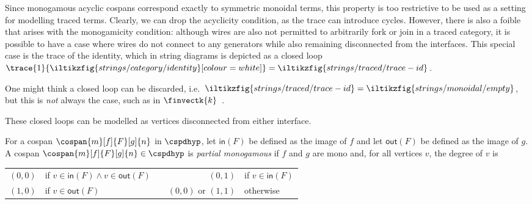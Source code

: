 Since monogamous acyclic cospans correspond exactly to symmetric monoidal terms,
this property is too restrictive to be used as a setting for modelling traced
terms.
Clearly, we can drop the acyclicity condition, as the trace can introduce
cycles.
However, there is also a foible that arises with the monogamicity condition:
although wires are also not permitted to arbitrarily fork or join in a traced
category, it is possible to have a case where wires do not connect to
any generators while also remaining disconnected from the interfaces.
This special case is the trace of the identity, which in string diagrams is
depicted as a closed
loop \(
\trace{1}{\iltikzfig{strings/category/identity}[colour=white]}
=
\iltikzfig{strings/traced/trace-id}
\).

\begin{remark}
    One might think a closed loop can be discarded, i.e.\ \(
    \iltikzfig{strings/traced/trace-id}
    =
    \iltikzfig{strings/monoidal/empty}
    \), but this is \emph{not} always the case, such as in
    \(\finvectk{k}\)~\cite[Sec.\ 6.1]{hasegawa1997recursion}.
\end{remark}

These closed loops can be modelled as vertices disconnected from either
interface.

\begin{definition}
    For a cospan \(\cospan{m}[f]{F}[g]{n}\) in
    \(\cspdhyp\), let \(\mathsf{in}(F)\) be defined as the image of \(f\) and
    let \(\mathsf{out}(F)\) be defined as the image of \(g\).
    A cospan \(\cospan{m}[f]{F}[g]{n} \in \cspdhyp\) is
    \emph{partial monogamous} if \(f\) and \(g\) are mono and, for all vertices
    \(v\), the degree of \(v\) is
    \begin{center}
        \begin{tabular}{rlcrl}
            \((0,0)\)
             &
            if \(v \in \mathsf{in}(F) \wedge v \in \mathsf{out}(F)\)
             &
            \quad
             &
            \((0,1)\)
             &
            if \(v \in \mathsf{in}(F)\)
            \\
            \((1,0)\)
             &
            if \(v \in \mathsf{out}(F)\)
             &
            \quad
             &
            \((0,0)\)
            or \((1,1)\)
             &
            otherwise
        \end{tabular}
    \end{center}
\end{definition}


